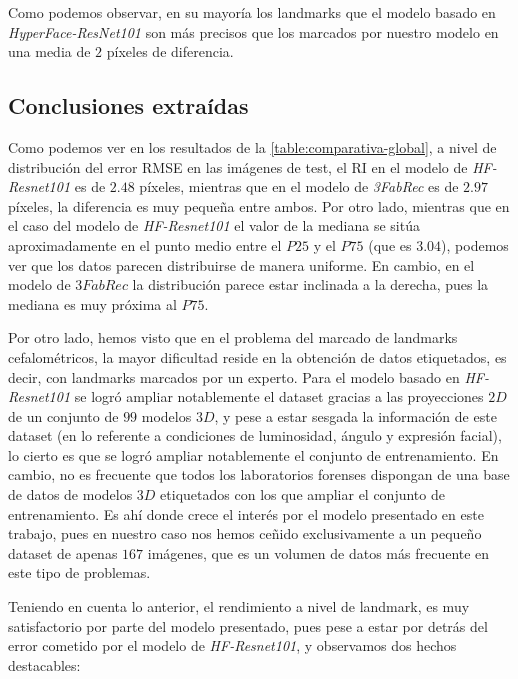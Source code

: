             \noindent Como podemos observar, en su mayoría los landmarks que el modelo basado en \textit{HyperFace-ResNet101} son más precisos que los marcados por nuestro modelo en una media de $2$ píxeles de diferencia.
           
        \subsection{Conclusiones extraídas}

            \noindent Como podemos ver en los resultados de la \autoref{table:comparativa-global}, a nivel de distribución del error RMSE en las imágenes de test, el RI en el modelo de \textit{HF-Resnet101} es de $2.48$ píxeles, mientras que en el modelo de \textit{3FabRec} es de $2.97$ píxeles, la diferencia es muy pequeña entre ambos. Por otro lado, mientras que en el caso del modelo de \textit{HF-Resnet101} el valor de la mediana se sitúa aproximadamente en el punto medio entre el $P25$ y el $P75$ (que es $3.04$), podemos ver que los datos parecen distribuirse de manera uniforme. En cambio, en el modelo de $3FabRec$ la distribución parece estar inclinada a la derecha, pues la mediana es muy próxima al $P75$.

            \medskip

            \noindent Por otro lado, hemos visto que en el problema del marcado de landmarks cefalométricos, la mayor dificultad reside en la obtención de datos etiquetados, es decir, con landmarks marcados por un experto. Para el modelo basado en \textit{HF-Resnet101} se logró ampliar notablemente el dataset gracias a las proyecciones $2D$ de un conjunto de $99$ modelos $3D$, y pese a estar sesgada la información de este dataset (en lo referente a condiciones de luminosidad, ángulo y expresión facial), lo cierto es que se logró ampliar notablemente el conjunto de entrenamiento. En cambio, no es frecuente que todos los laboratorios forenses dispongan de una base de datos de modelos $3D$ etiquetados con los que ampliar el conjunto de entrenamiento. Es ahí donde crece el interés por el modelo presentado en este trabajo, pues en nuestro caso nos hemos ceñido exclusivamente a un pequeño dataset de apenas $167$ imágenes, que es un volumen de datos más frecuente en este tipo de problemas. 
            
            \noindent Teniendo en cuenta lo anterior, el rendimiento a nivel de landmark, es muy satisfactorio por parte del modelo presentado, pues pese a estar por detrás del error cometido por el modelo de \textit{HF-Resnet101}, y observamos dos hechos destacables: 

